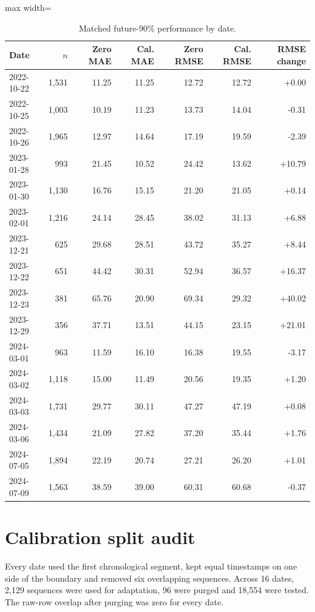\documentclass[review,12pt,authoryear]{elsarticle}
\begin{document}
\begin{table}[H]
\centering
\caption{Matched future-90\% performance by date.}
\label{tab:perdate}
\begin{adjustbox}{max width=\textwidth}
\begin{tabular}{lrrrrrr}
\toprule
Date & $n$ & Zero MAE & Cal. MAE & Zero RMSE & Cal. RMSE & RMSE change \\
\midrule
2022-10-22 & 1,531 & 11.25 & 11.25 & 12.72 & 12.72 & +0.00 \\
2022-10-25 & 1,003 & 10.19 & 11.23 & 13.73 & 14.04 & -0.31 \\
2022-10-26 & 1,965 & 12.97 & 14.64 & 17.19 & 19.59 & -2.39 \\
2023-01-28 & 993 & 21.45 & 10.52 & 24.42 & 13.62 & +10.79 \\
2023-01-30 & 1,130 & 16.76 & 15.15 & 21.20 & 21.05 & +0.14 \\
2023-02-01 & 1,216 & 24.14 & 28.45 & 38.02 & 31.13 & +6.88 \\
2023-12-21 & 625 & 29.68 & 28.51 & 43.72 & 35.27 & +8.44 \\
2023-12-22 & 651 & 44.42 & 30.31 & 52.94 & 36.57 & +16.37 \\
2023-12-23 & 381 & 65.76 & 20.90 & 69.34 & 29.32 & +40.02 \\
2023-12-29 & 356 & 37.71 & 13.51 & 44.15 & 23.15 & +21.01 \\
2024-03-01 & 963 & 11.59 & 16.10 & 16.38 & 19.55 & -3.17 \\
2024-03-02 & 1,118 & 15.00 & 11.49 & 20.56 & 19.35 & +1.20 \\
2024-03-03 & 1,731 & 29.77 & 30.11 & 47.27 & 47.19 & +0.08 \\
2024-03-06 & 1,434 & 21.09 & 27.82 & 37.20 & 35.44 & +1.76 \\
2024-07-05 & 1,894 & 22.19 & 20.74 & 27.21 & 26.20 & +1.01 \\
2024-07-09 & 1,563 & 38.59 & 39.00 & 60.31 & 60.68 & -0.37 \\
\bottomrule
\end{tabular}
\end{adjustbox}
\end{table}

\section{Calibration split audit}

Every date used the first chronological segment, kept equal timestamps on one
side of the boundary and removed six overlapping sequences. Across 16 dates,
2,129 sequences were used for adaptation, 96 were purged and 18,554 were
tested. The raw-row overlap after purging was zero for every date.
\end{document}
